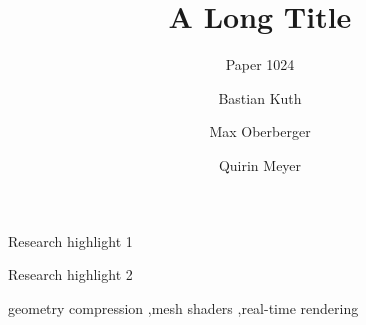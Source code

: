 \documentclass[final,3p,twocolumn]{elsarticle}
\begin{document}
\begin{frontmatter}
\title{A Long Title}
{
       \author[secret]{Paper 1024}
}
{
\author[hsc]{Bastian Kuth}
\author[amd]{Max Oberberger}
\author[hsc]{Quirin Meyer}

}
\begin{abstract}
       
\end{abstract}

\let\oldcaption\caption
\let\oldlabel\label
\renewcommand{\caption}[2][]{\\#1}
\renewcommand{\label}[1]{}
\begin{graphicalabstract}
       
\end{graphicalabstract}
\let\caption\oldcaption
\let\label\oldlabel


\begin{highlights}
       \item Research highlight 1
       \item Research highlight 2
       \end{highlights}
       
\begin{keyword}
geometry compression \sep mesh shaders \sep real-time rendering
\end{keyword}      
\end{frontmatter}
\begin{figure}[t]
       
\end{figure}





\end{document}
